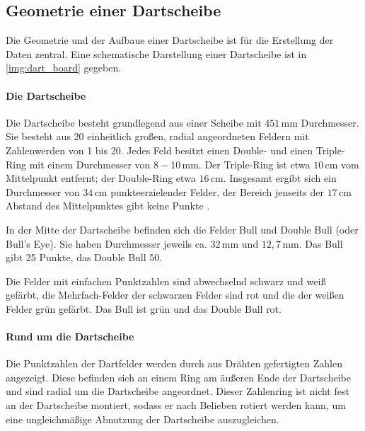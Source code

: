 
\subsection{Geometrie einer Dartscheibe}  %
\label{sec:dartscheiben_geometrie}

Die Geometrie und der Aufbaue einer Dartscheibe ist für die Erstellung der Daten zentral. Eine schematische Darstellung einer Dartscheibe ist in \autoref{img:dart_board} gegeben.

\paragraph{Die Dartscheibe}

Die Dartscheibe besteht grundlegend aus einer Scheibe mit $451\,\text{mm}$ Durchmesser. Sie besteht aus 20 einheitlich großen, radial angeordneten Feldern mit Zahlenwerden von 1 bis 20. Jedes Feld besitzt einen Double- und einen Triple-Ring mit einem Durchmesser von $8-10\,\text{mm}$. Der Triple-Ring ist etwa $10\,\text{cm}$ vom Mittelpunkt entfernt; der Double-Ring etwa $16\,\text{cm}$. Insgesamt ergibt sich ein Durchmesser von $34\,\text{cm}$ punkteerzielender Felder, der Bereich jenseits der $17\,\text{cm}$ Abstand des Mittelpunktes gibt keine Punkte \cite{wdf-rules}.

In der Mitte der Dartscheibe befinden sich die Felder Bull und Double Bull (oder Bull's Eye). Sie haben Durchmesser jeweils ca. $32\,\text{mm}$ und $12,7\,\text{mm}$. Das Bull gibt 25 Punkte, das Double Bull 50.

Die Felder mit einfachen Punktzahlen sind abwechselnd schwarz und weiß gefärbt, die Mehrfach-Felder der schwarzen Felder sind rot und die der weißen Felder grün gefärbt. Das Bull ist grün und das Double Bull rot.

\paragraph{Rund um die Dartscheibe}

Die Punktzahlen der Dartfelder werden durch aus Drähten gefertigten Zahlen angezeigt. Diese befinden sich an einem Ring am äußeren Ende der Dartscheibe und sind radial um die Dartscheibe angeordnet. Dieser Zahlenring ist nicht fest an der Dartscheibe montiert, sodass er nach Belieben rotiert werden kann, um eine ungleichmäßige Abnutzung der Dartscheibe auszugleichen.

